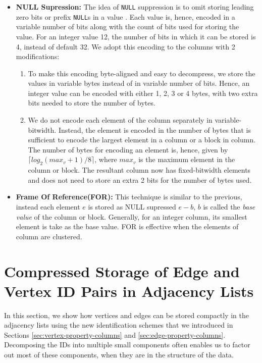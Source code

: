 \begin{itemize}
	\item \textbf{NULL Supression:} The idea of \texttt{NULL} suppression is to omit storing leading zero bits or prefix \texttt{NULL}s in a value \cite{beckmann:sparse}. Each value is, hence, encoded in a variable number of bits along with the count of bits used for storing the value. For an integer value 12, the number of bits in which it can be stored is 4, instead of default 32. We adopt this encoding to the columns with 2 modifications:
	\begin{enumerate}
		\item To make this encoding byte-aligned and easy to decompress, we store the values in variable bytes instead of in variable number of bits. Hence, an integer value can be encoded with either 1, 2, 3 or 4 bytes, with two extra bits needed to store the number of bytes. 
		\item We do not encode each element of the column separately in variable-bitwidth. Instead, the element is encoded in the number of bytes that is sufficient to encode the largest element in a column or a block in column. The number of bytes for encoding an element is, hence, given by $\lceil log_2(max_v+1)/8\rceil$, where $max_v$ is the maximum element in the column or block. The resultant column now has fixed-bitwidth elements and does not need to store an extra 2 bits for the number of bytes used.
	\end{enumerate}

	\item \textbf{Frame Of Reference(FOR): }This technique is similar to the previous, instead each element $e$ is stored as NULL supressed $e-b$, $b$ is called the \emph{base value} of the column or block. Generally, for an integer column, its smallest element is take as the base value. FOR is effective when the elements of column are clustered.
	
\end{itemize}

\section{Compressed Storage of Edge and Vertex ID Pairs in Adjacency Lists}
\label{sec:storage-optimizations}

In this section, we show how vertices and edges can be stored compactly in the adjacency lists using the new identification schemes that we introduced in Sections \ref{sec:vertex-property-columns} and \ref{sec:edge-property-columns}. Decomposing the IDs into multiple small components often enables us to factor out most of these components, when they are in the structure of the data.  

